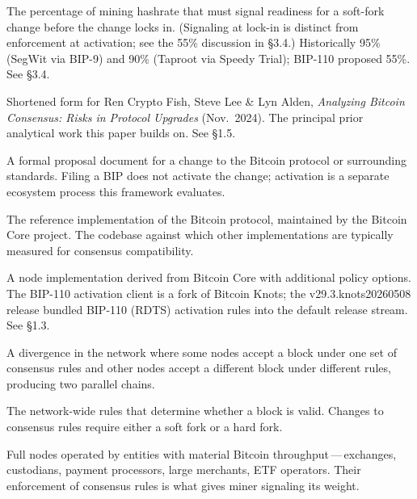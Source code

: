 \documentclass[11pt, twoside, openright]{book}
\newcommand{\sect}[1]{\S#1}
\begin{document}
\begin{description}[leftmargin=0pt, labelindent=0pt, style=nextline, itemsep=8pt]
  \item[Activation threshold.] The percentage of mining hashrate that must signal readiness for a soft-fork change before the change locks in. (Signaling at lock-in is distinct from enforcement at activation; see the 55\% discussion in \sect{3.4}.) Historically 95\% (SegWit via BIP-9) and 90\% (Taproot via Speedy Trial); BIP-110 proposed 55\%. See \sect{3.4}.

  \item[\textit{BCAP}.] Shortened form for Ren Crypto Fish, Steve Lee \& Lyn Alden, \textit{Analyzing Bitcoin Consensus: Risks in Protocol Upgrades} (Nov.~2024). The principal prior analytical work this paper builds on. See \sect{1.5}.

  \item[BIP (Bitcoin Improvement Proposal).] A formal proposal document for a change to the Bitcoin protocol or surrounding standards. Filing a BIP does not activate the change; activation is a separate ecosystem process this framework evaluates.

  \item[Bitcoin Core.] The reference implementation of the Bitcoin protocol, maintained by the Bitcoin Core project. The codebase against which other implementations are typically measured for consensus compatibility.

  \item[Bitcoin Knots.] A node implementation derived from Bitcoin Core with additional policy options. The BIP-110 activation client is a fork of Bitcoin Knots; the v29.3.knots20260508 release bundled BIP-110 (RDTS) activation rules into the default release stream. See \sect{1.3}.

  \item[Chain split.] A divergence in the network where some nodes accept a block under one set of consensus rules and other nodes accept a different block under different rules, producing two parallel chains.

  \item[Consensus rules.] The network-wide rules that determine whether a block is valid. Changes to consensus rules require either a soft fork or a hard fork.

  \item[Economic Nodes.] Full nodes operated by entities with material Bitcoin throughput\,---\,exchanges, custodians, payment processors, large merchants, ETF operators. Their enforcement of consensus rules is what gives miner signaling its weight.


\end{description}
\end{document}
